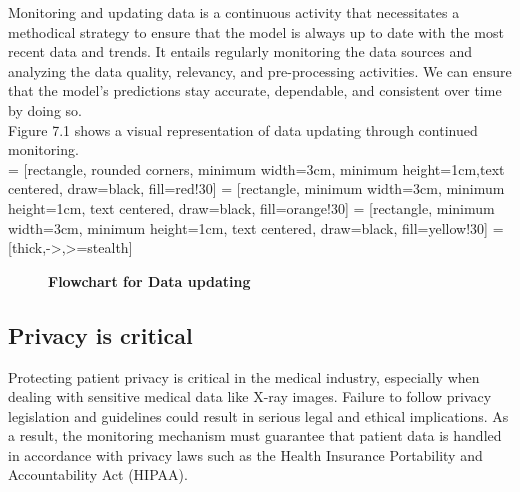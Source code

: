 Monitoring and updating data is a continuous activity that necessitates a methodical strategy to ensure that the model is always up to date with the most recent data and trends. It entails regularly monitoring the data sources and analyzing the data quality, relevancy, and pre-processing activities. We can ensure that the model's predictions stay accurate, dependable, and consistent over time by doing so.\\

Figure 7.1 shows a visual representation of data updating through continued monitoring.\\

 = [rectangle, rounded corners, minimum width=3cm, minimum height=1cm,text centered, draw=black, fill=red!30]
 = [rectangle, minimum width=3cm, minimum height=1cm, text centered, draw=black, fill=orange!30]
 = [rectangle, minimum width=3cm, minimum height=1cm, text centered, draw=black, fill=yellow!30]
 = [thick,->,>=stealth]
\begin{figure}[htb]
	\centering
{}
\footnotesize 	\caption{\textbf{Flowchart for Data updating}}
\label{fig:Flowchart for Data updating}
\end{figure}

\subsection{Privacy is critical}

Protecting patient privacy is critical in the medical industry, especially when dealing with sensitive medical data like X-ray images. Failure to follow privacy legislation and guidelines could result in serious legal and ethical implications. As a result, the monitoring mechanism must guarantee that patient data is handled in accordance with privacy laws such as the Health Insurance Portability and Accountability Act (HIPAA).\\


